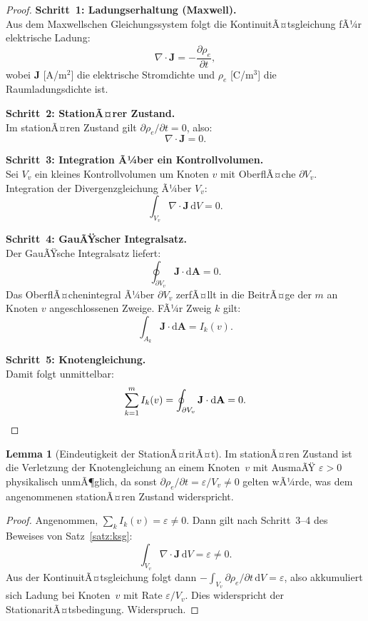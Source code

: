 ﻿\documentclass[a4paper,12pt]{article}
\theoremstyle{definition}
\newtheorem{lemma}{Lemma}
\begin{document}
\begin{proof}
  \textbf{Schritt~1: Ladungserhaltung (Maxwell).}\\
  Aus dem Maxwellschen Gleichungssystem folgt die KontinuitÃ¤tsgleichung
  fÃ¼r elektrische Ladung:
  \[
    \nabla \cdot \mathbf{J} = -\frac{\partial \rho_e}{\partial t},
  \]
  wobei $\mathbf{J}$ [A/m$^2$] die elektrische Stromdichte und $\rho_e$
  [C/m$^3$] die Raumladungsdichte ist.

  \textbf{Schritt~2: StationÃ¤rer Zustand.}\\
  Im stationÃ¤ren Zustand gilt $\partial \rho_e / \partial t = 0$, also:
  \[
    \nabla \cdot \mathbf{J} = 0.
  \]

  \textbf{Schritt~3: Integration Ã¼ber ein Kontrollvolumen.}\\
  Sei $V_v$ ein kleines Kontrollvolumen um Knoten $v$ mit OberflÃ¤che
  $\partial V_v$. Integration der Divergenzgleichung Ã¼ber $V_v$:
  \[
    \int_{V_v} \nabla \cdot \mathbf{J}\, \mathrm{d}V = 0.
  \]

  \textbf{Schritt~4: GauÃŸscher Integralsatz.}\\
  Der GauÃŸsche Integralsatz liefert:
  \[
    \oint_{\partial V_v} \mathbf{J} \cdot \mathrm{d}\mathbf{A} = 0.
  \]
  Das OberflÃ¤chenintegral Ã¼ber $\partial V_v$ zerfÃ¤llt in die BeitrÃ¤ge
  der $m$ an Knoten $v$ angeschlossenen Zweige. FÃ¼r Zweig $k$ gilt:
  \[
    \int_{A_k} \mathbf{J} \cdot \mathrm{d}\mathbf{A} = I_k(v).
  \]

  \textbf{Schritt~5: Knotengleichung.}\\
  Damit folgt unmittelbar:
  \[
    \sum_{k=1}^{m} I_k(v) = \oint_{\partial V_v} \mathbf{J} \cdot \mathrm{d}\mathbf{A} = 0. \qedhere
  \]
\end{proof}

\begin{lemma}[Eindeutigkeit der StationÃ¤ritÃ¤t]
  \label{lem:stationaer}
  Im stationÃ¤ren Zustand ist die Verletzung der Knotengleichung an einem
  Knoten~$v$ mit AusmaÃŸ $\varepsilon > 0$ physikalisch unmÃ¶glich, da sonst
  $\partial \rho_e / \partial t = \varepsilon / V_v \neq 0$ gelten wÃ¼rde, was
  dem angenommenen stationÃ¤ren Zustand widerspricht.
\end{lemma}

\begin{proof}
  Angenommen, $\sum_k I_k(v) = \varepsilon \neq 0$. Dann gilt nach
  Schritt~3--4 des Beweises von Satz~\ref{satz:ksg}:
  \[
    \int_{V_v} \nabla \cdot \mathbf{J}\, \mathrm{d}V = \varepsilon \neq 0.
  \]
  Aus der KontinuitÃ¤tsgleichung folgt dann
  $-\int_{V_v} \partial\rho_e/\partial t\, \mathrm{d}V = \varepsilon$,
  also akkumuliert sich Ladung bei Knoten~$v$ mit Rate $\varepsilon/V_v$.
  Dies widerspricht der StationaritÃ¤tsbedingung. Widerspruch. \qedhere
\end{proof}
\end{document}
